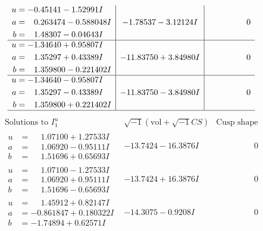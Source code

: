 \documentclass[1p]{elsarticle_modified}
\theoremstyle{definition}
\newcommand{\I}{\sqrt{-1}}
\begin{document}
$$\begin{array}{c|c|c}
\begin{aligned}
u &= -0.45141 - 1.52991 I \\
a &= \phantom{-}0.263474 - 0.588048 I \\
b &= \phantom{-}1.48307 - 0.04643 I\end{aligned}
 & -1.78537 - 3.12124 I & \phantom{-0.000000 } 0 \\ \hline\begin{aligned}
u &= -1.34640 + 0.95807 I \\
a &= \phantom{-}1.35297 + 0.43389 I \\
b &= \phantom{-}1.359800 - 0.221402 I\end{aligned}
 & -11.83750 + 3.84980 I & \phantom{-0.000000 } 0 \\ \hline\begin{aligned}
u &= -1.34640 - 0.95807 I \\
a &= \phantom{-}1.35297 - 0.43389 I \\
b &= \phantom{-}1.359800 + 0.221402 I\end{aligned}
 & -11.83750 - 3.84980 I & \phantom{-0.000000 } 0\\
 \hline 
 \end{array}$$\newpage$$\begin{array}{c|c|c}  
\text{Solutions to }I^u_{1}& \I (\text{vol} + \sqrt{-1}CS) & \text{Cusp shape}\\
 \hline 
\begin{aligned}
u &= \phantom{-}1.07100 + 1.27533 I \\
a &= \phantom{-}1.06920 - 0.95111 I \\
b &= \phantom{-}1.51696 + 0.65693 I\end{aligned}
 & -13.7424 - 16.3876 I & \phantom{-0.000000 } 0 \\ \hline\begin{aligned}
u &= \phantom{-}1.07100 - 1.27533 I \\
a &= \phantom{-}1.06920 + 0.95111 I \\
b &= \phantom{-}1.51696 - 0.65693 I\end{aligned}
 & -13.7424 + 16.3876 I & \phantom{-0.000000 } 0 \\ \hline\begin{aligned}
u &= \phantom{-}1.45912 + 0.82147 I \\
a &= -0.861847 + 0.180322 I \\
b &= -1.74894 + 0.62571 I\end{aligned}
 & -14.3075 - 0.9208 I & \phantom{-0.000000 } 0 \\ \hline\begin{aligned}

\end{aligned}
\end{array}$$
\end{document}
